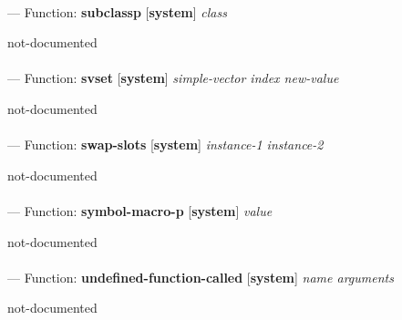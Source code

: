 \paragraph{}
\label{SYSTEM:SUBCLASSP}
--- Function: \textbf{subclassp} [\textbf{system}] \textit{class}

\begin{adjustwidth}{5em}{5em}
not-documented
\end{adjustwidth}

\paragraph{}
\label{SYSTEM:SVSET}
--- Function: \textbf{svset} [\textbf{system}] \textit{simple-vector index new-value}

\begin{adjustwidth}{5em}{5em}
not-documented
\end{adjustwidth}

\paragraph{}
\label{SYSTEM:SWAP-SLOTS}
--- Function: \textbf{swap-slots} [\textbf{system}] \textit{instance-1 instance-2}

\begin{adjustwidth}{5em}{5em}
not-documented
\end{adjustwidth}

\paragraph{}
\label{SYSTEM:SYMBOL-MACRO-P}
--- Function: \textbf{symbol-macro-p} [\textbf{system}] \textit{value}

\begin{adjustwidth}{5em}{5em}
not-documented
\end{adjustwidth}

\paragraph{}
\label{SYSTEM:UNDEFINED-FUNCTION-CALLED}
--- Function: \textbf{undefined-function-called} [\textbf{system}] \textit{name arguments}

\begin{adjustwidth}{5em}{5em}
not-documented
\end{adjustwidth}

